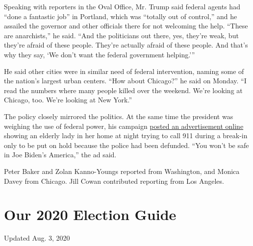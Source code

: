 Speaking with reporters in the Oval Office, Mr. Trump said federal
agents had ``done a fantastic job'' in Portland, which was ``totally out
of control,'' and he assailed the governor and other officials there for
not welcoming the help. ``These are anarchists,'' he said. ``And the
politicians out there, yes, they're weak, but they're afraid of these
people. They're actually afraid of these people. And that's why they
say, `We don't want the federal government helping.'''

He said other cities were in similar need of federal intervention,
naming some of the nation's largest urban centers. ``How about
Chicago?'' he said on Monday. ``I read the numbers where many people
killed over the weekend. We're looking at Chicago, too. We're looking at
New York.''

The policy closely mirrored the politics. At the same time the president
was weighing the use of federal power, his campaign
\href{https://twitter.com/DonaldJTrumpJr/status/1285325829870956546}{posted
an advertisement online} showing an elderly lady in her home at night
trying to call 911 during a break-in only to be put on hold because the
police had been defunded. ``You won't be safe in Joe Biden's America,''
the ad said.

Peter Baker and Zolan Kanno-Youngs reported from Washington, and Monica
Davey from Chicago. Jill Cowan contributed reporting from Los Angeles.

\hypertarget{our-2020-election-guide}{%
\section{Our 2020 Election Guide}\label{our-2020-election-guide}}

Updated Aug. 3, 2020


